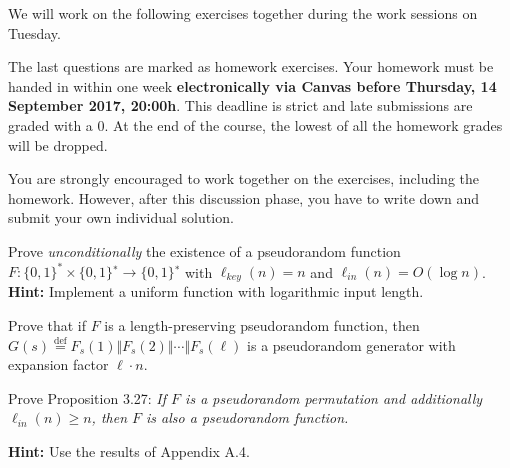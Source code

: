 \documentclass[a4paper,10pt,landscape,twocolumn]{scrartcl}
\newcommand\deadline{Thursday, 14 September 2017, 20:00h}
\begin{document}
\problems

{\sffamily\noindent
We will work on the following exercises together during the work sessions on Tuesday. 

The last questions are marked as homework exercises. 
Your homework must be handed in within one week \textbf{electronically via Canvas before \deadline}. This deadline is strict and late submissions are graded with a 0. At the end of the course, the lowest of all the homework grades will be dropped. 

You are strongly encouraged to work together on the exercises, including the homework. However, after this discussion phase, you have to write down and submit your own individual solution. }

\begin{exercise}
  Prove \emph{unconditionally} the existence of a pseudorandom function $F : \{0,1\}^* \times \{0,1\}^∗\to \{0,1\}^∗$ with $\ell_{key}(n)=n$ and $\ell_{in}(n)=O(\log n)$.
  \textbf{Hint:} Implement a uniform function with logarithmic input length.
\end{exercise}

\begin{exercise}
Prove that if $F$ is a length-preserving pseudorandom function, then
$G(s) \overset{\text{def}}{=} F_s(1)\Vert F_s(2)\Vert \cdots \Vert F_s(\ell)$ is a pseudorandom generator with expansion factor $\ell \cdot n$.
\end{exercise}

\begin{exercise}
  Prove Proposition 3.27:
  \textit{
If $F$ is a pseudorandom permutation and additionally $\ell_{in}(n) \geq n$, then $F$ is also a pseudorandom function.
  }
  
\textbf{Hint:} Use the results of Appendix A.4.

\end{exercise}
\end{document}
